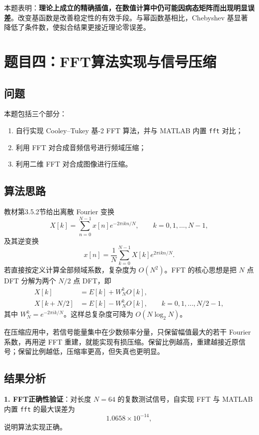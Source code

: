 \documentclass[UTF8,a4paper,11pt]{article}
\begin{document}
本题表明：\textbf{理论上成立的精确插值，在数值计算中仍可能因病态矩阵而出现明显误差}。改变基函数是改善稳定性的有效手段。与幂函数基相比，Chebyshev 基显著降低了条件数，使拟合结果更接近理论零误差。

\section[题目四]{题目四：FFT算法实现与信号压缩}

\subsection{问题}

本题包括三个部分：
\begin{enumerate}
  \item 自行实现 Cooley--Tukey 基-2 FFT 算法，并与 MATLAB 内置 \texttt{fft} 对比；
  \item 利用 FFT 对合成音频信号进行频域压缩；
  \item 利用二维 FFT 对合成图像进行压缩。
\end{enumerate}

\subsection{算法思路}

教材第3.5.2节给出离散 Fourier 变换
\[
X[k]=\sum_{n=0}^{N-1}x[n]e^{-2\pi i kn/N},\qquad k=0,1,\dots,N-1,
\]
及其逆变换
\[
x[n]=\frac{1}{N}\sum_{k=0}^{N-1}X[k]e^{2\pi i kn/N}.
\]
若直接按定义计算全部频域系数，复杂度为 $O(N^2)$。FFT 的核心思想是把 $N$ 点 DFT 分解为两个 $N/2$ 点 DFT，即
\[
\begin{aligned}
X[k] &= E[k]+W_N^kO[k],\\
X[k+N/2] &= E[k]-W_N^kO[k],\qquad k=0,1,\dots,N/2-1,
\end{aligned}
\]
其中 $W_N^k=e^{-2\pi i k/N}$。这样总复杂度可降为 $O(N\log_2N)$。

在压缩应用中，若信号能量集中在少数频率分量，只保留幅值最大的若干 Fourier 系数，再用逆 FFT 重建，就能实现有损压缩。保留比例越高，重建越接近原信号；保留比例越低，压缩率更高，但失真也更明显。

\subsection{结果分析}

\textbf{1. FFT正确性验证}：对长度 $N=64$ 的复数测试信号，自实现 FFT 与 MATLAB 内置 \texttt{fft} 的最大误差为
\[
1.0658\times10^{-14},
\]
说明算法实现正确。
\end{document}
